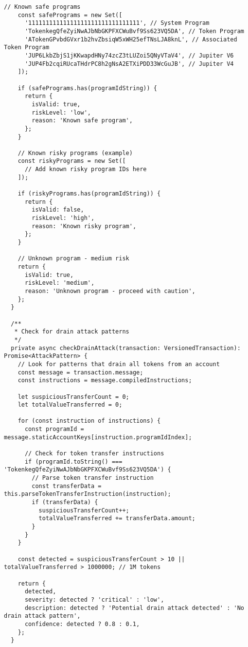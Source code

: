 \documentclass[11pt,a4paper]{article}
\begin{document}
\begin{lstlisting}[style=typescript, caption=Comprehensive Transaction Security]
    // Known safe programs
    const safePrograms = new Set([
      '11111111111111111111111111111111', // System Program
      'TokenkegQfeZyiNwAJbNbGKPFXCWuBvf9Ss623VQ5DA', // Token Program
      'ATokenGPvbdGVxr1b2hvZbsiqW5xWH25efTNsLJA8knL', // Associated Token Program
      'JUP6LkbZbjS1jKKwapdHNy74zcZ3tLUZoi5QNyVTaV4', // Jupiter V6
      'JUP4Fb2cqiRUcaTHdrPC8h2gNsA2ETXiPDD33WcGuJB', // Jupiter V4
    ]);

    if (safePrograms.has(programIdString)) {
      return {
        isValid: true,
        riskLevel: 'low',
        reason: 'Known safe program',
      };
    }

    // Known risky programs (example)
    const riskyPrograms = new Set([
      // Add known risky program IDs here
    ]);

    if (riskyPrograms.has(programIdString)) {
      return {
        isValid: false,
        riskLevel: 'high',
        reason: 'Known risky program',
      };
    }

    // Unknown program - medium risk
    return {
      isValid: true,
      riskLevel: 'medium',
      reason: 'Unknown program - proceed with caution',
    };
  }

  /**
   * Check for drain attack patterns
   */
  private async checkDrainAttack(transaction: VersionedTransaction): Promise<AttackPattern> {
    // Look for patterns that drain all tokens from an account
    const message = transaction.message;
    const instructions = message.compiledInstructions;

    let suspiciousTransferCount = 0;
    let totalValueTransferred = 0;

    for (const instruction of instructions) {
      const programId = message.staticAccountKeys[instruction.programIdIndex];
      
      // Check for token transfer instructions
      if (programId.toString() === 'TokenkegQfeZyiNwAJbNbGKPFXCWuBvf9Ss623VQ5DA') {
        // Parse token transfer instruction
        const transferData = this.parseTokenTransferInstruction(instruction);
        if (transferData) {
          suspiciousTransferCount++;
          totalValueTransferred += transferData.amount;
        }
      }
    }

    const detected = suspiciousTransferCount > 10 || totalValueTransferred > 1000000; // 1M tokens

    return {
      detected,
      severity: detected ? 'critical' : 'low',
      description: detected ? 'Potential drain attack detected' : 'No drain attack pattern',
      confidence: detected ? 0.8 : 0.1,
    };
  }


\end{lstlisting}
\end{document}
